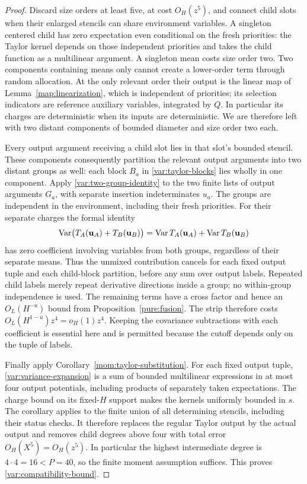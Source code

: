\begin{proof}
Discard size orders at least
five, at cost $O_H(z^5)$, and connect child slots when their enlarged
stencils can share environment variables.  A singleton centered child
has zero expectation even conditional on
the fresh priorities: the Taylor kernel depends on those independent
priorities and takes the child function as a multilinear argument.
A singleton mean costs size order two.  Two components containing means
only cannot create a lower-order term through random allocation.  At the
only relevant order their output is the linear map of
Lemma~\ref{map:linearization}, which is independent of priorities;
its selection indicators are reference auxiliary variables, integrated
by $Q$.  In particular its charges are deterministic when its inputs
are deterministic.  We are therefore left with two distant components
of bounded diameter and size order two each.

Every output argument receiving a child slot lies in that slot's
bounded stencil.  These components consequently partition the relevant
output arguments into two distant groups as well: each block $B_a$
in \eqref{var:taylor-blocks} lies wholly in one component.  Apply
\eqref{var:two-group-identity} to the two finite lists of output
arguments $G_a$, with separate insertion indeterminates $u_a$.
The groups are
independent in the environment, including their fresh priorities.
For their separate charges the formal identity
\[
 \operatorname{Var}\bigl(T_A(\mathbf u_A)+T_B(\mathbf u_B)\bigr)
 =\operatorname{Var} T_A(\mathbf u_A)+\operatorname{Var} T_B(\mathbf u_B)
\]
has zero coefficient involving variables from both groups, regardless
of their separate means.  Thus the unmixed contribution cancels for
each fixed output tuple and each child-block partition, before any
sum over output labels.  Repeated child labels merely repeat derivative
directions inside a group; no within-group independence is used.
The remaining terms have a cross factor and hence
an $O_L(H^{-u})$ bound from Proposition~\ref{pure:fusion}.
The strip therefore costs
$O_L(H^{1-u})z^4=o_H(1)z^4$.  Keeping the covariance subtractions with
each coefficient is essential here and is permitted because the cutoff
depends only on the tuple of labels.

Finally apply Corollary~\ref{mom:taylor-substitution}.  For each fixed
output tuple, \eqref{var:variance-expansion} is a sum of bounded
multilinear expressions in at most four output potentials, including
products of separately taken expectations.  The charge bound on its
fixed-$H$ support makes the kernels uniformly bounded in $s$.  The
corollary applies to the finite union of all determining stencils,
including their status checks.  It therefore replaces the regular
Taylor output by the actual output and removes child degrees above
four with total error $O_H(X^5)=O_H(z^5)$.  In particular the highest
intermediate degree is $4\cdot4=16<P=40$, so the finite moment
assumption suffices.  This proves \eqref{var:compatibility-bound}.
\end{proof}

